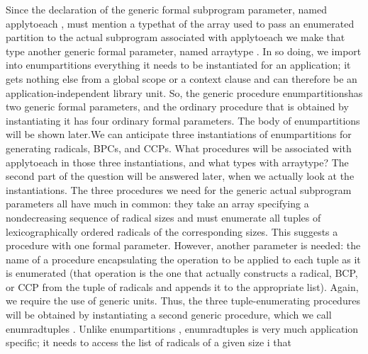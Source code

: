 \EndParbox[]
\FgEndblock[]
 Since the declaration of the generic formal subprogram parameter,
named \tyxffmxmono[]apply\Symuns[]to\Symuns[]each%
\tyxffmxendmono[], must mention a type\EmDash[]that of the array used
to pass an enumerated partition to the actual subprogram associated
with \tyxffmxmono[]apply\Symuns[]to\Symuns[]each%
\tyxffmxendmono[]\EmDash[]we make that type another generic formal
parameter, named \tyxffmxmono[]array\Symuns[]type%
\tyxffmxendmono[]. In so doing, we import into \tyxffmxmono[]enum\Symuns[]partitions%
\tyxffmxendmono[] everything it needs to be instantiated for an application;
it gets nothing else from a global scope or a context clause and can
therefore be an application-independent library unit. So, the generic
procedure \tyxffmxmono[]enum\Symuns[]partitions\tyxffmxendmono[] has
two generic formal parameters, and the ordinary procedure that is
obtained by instantiating it has four ordinary formal parameters.
The body of \tyxffmxmono[]enum\Symuns[]partitions%
\tyxffmxendmono[] will be shown later.\Endpara[]
\Para[]We can anticipate three instantiations of \tyxffmxmono[]enum\Symuns[]partitions%
\tyxffmxendmono[]\EmDash[]for generating radicals, BPCs, and CCPs.
What procedures will be associated with \tyxffmxmono[]apply\Symuns[]to\Symuns[]each%
\tyxffmxendmono[] in those three instantiations, and what types with
\tyxffmxmono[]array\Symuns[]type\tyxffmxendmono[]? The second part
of the question will be answered later, when we actually look at the
instantiations. The three procedures we need for the generic actual
subprogram parameters all have much in common: they take an array
specifying a nondecreasing sequence of radical sizes and must enumerate
all tuples of lexicographically ordered radicals of the corresponding
sizes. This suggests a procedure with one formal parameter. However,
another parameter is needed: the name of a procedure encapsulating
the operation to be applied to each tuple as it is enumerated (that
operation is the one that actually constructs a radical, BCP, or CCP
from the tuple of radicals and appends it to the appropriate list).
Again, we require the use of generic units. Thus, the three tuple-enumerating
procedures will be obtained by instantiating a second generic procedure,
which we call \tyxffmxmono[]enum\Symuns[]rad\Symuns[]tuples%
\tyxffmxendmono[]. Unlike \tyxffmxmono[]enum\Symuns[]partitions%
\tyxffmxendmono[], \tyxffmxmono[]enum\Symuns[]rad\Symuns[]tuples%
\tyxffmxendmono[] is very much application specific; it needs to access
the list of radicals of a given size \InlEqn[]\LmthEqn[]i
\LmthEndeqn[]\EndInlEqn[]\EmDash[]that
